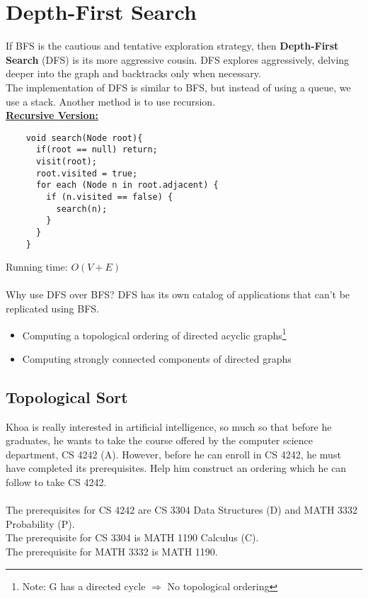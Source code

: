 \documentclass[]{book}
\begin{document}
  \section{Depth-First Search}
  If BFS is the cautious and tentative exploration strategy, then \textbf{Depth-First Search}
  (DFS) is its more aggressive cousin. DFS explores aggressively, delving deeper
  into the graph and backtracks only when necessary.\\
  \indent The implementation of DFS is similar to BFS, but instead of using a queue, we
  use a stack. Another method is to use recursion.
  \pagebreak\\
  \underline{\textbf{Recursive Version:}}
  \begin{verbatim}
    void search(Node root){
      if(root == null) return;
      visit(root);
      root.visited = true;
      for each (Node n in root.adjacent) {
        if (n.visited == false) {
          search(n);
        }
      }
    }
  \end{verbatim}
  Running time: $O(V+E)$\\\\
  Why use DFS over BFS? DFS has its own catalog of applications that can't be replicated
  using BFS.
  \begin{itemize}
    \item Computing a topological ordering of directed acyclic graphs\footnote{
    Note: G has a directed cycle $\Longrightarrow$ No topological ordering
    }
    \item Computing strongly connected components of directed graphs
  \end{itemize}

  \subsection*{Topological Sort}
  Khoa is really interested in artificial intelligence, so much so that before he graduates,
  he wants to take the course offered by the computer science department, CS 4242 (A).
  However, before he can enroll in CS 4242, he must have completed its prerequisites.
  Help him construct an ordering which he can follow to take CS 4242.\\\\
  The prerequisites for CS 4242 are CS 3304 Data Structures (D) and MATH 3332 Probability (P).\\
  The prerequisite for CS 3304 is MATH 1190 Calculus (C).\\
  The prerequisite for MATH 3332 is MATH 1190.
\end{document}
